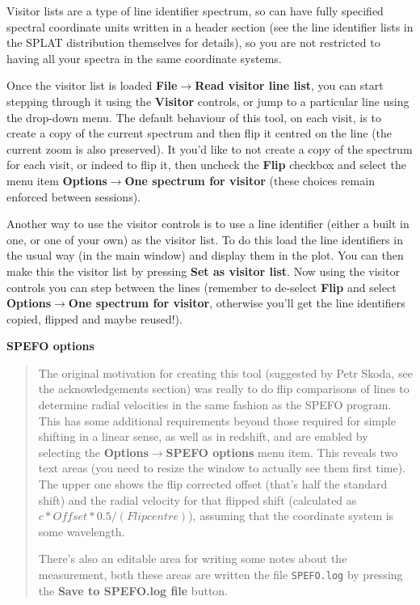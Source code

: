 \documentclass[twoside,11pt]{article}
\newcommand{\latexhtml}[2]{#1}
\renewcommand{\_}{\texttt{\symbol{95}}}
\newcommand{\submenuitem}[2]{\latexhtml{\textbf{#1$\rightarrow$#2}}{\textbf{#1->#2}}}
\newcommand{\labelitem}[1]{\textbf{#1}}
\newcommand{\hitext}[1]{\texttt{#1}}
\newcommand{\subheading}[1]{\textbf{\large{#1}}}
\begin{document}
Visitor lists are a type of line identifier spectrum, so can have fully
specified spectral coordinate units written in a header section (see the line
identifier lists in the SPLAT distribution themselves for details), so you are
not restricted to having all your spectra in the same coordinate systems.

Once the visitor list is loaded \submenuitem{File}{Read visitor line list},
you can start stepping through it using the \labelitem{Visitor} controls, or
jump to a particular line using the drop-down menu. The default behaviour of
this tool, on each visit, is to create a copy of the current spectrum and then
flip it centred on the line (the current zoom is also preserved). It you'd
like to not create a copy of the spectrum for each visit, or indeed to flip
it, then uncheck the \labelitem{Flip} checkbox and select the menu item
\submenuitem{Options}{One spectrum for visitor} (these choices remain enforced
between sessions).

Another way to use the visitor controls is to use a line identifier (either a
built in one, or one of your own) as the visitor list. To do this load the
line identifiers in the usual way (in the main window) and display them in the
plot. You can then make this the visitor list by pressing
\labelitem{Set as visitor list}. Now using the visitor controls you can step
between the lines (remember to de-select \labelitem{Flip} and select
\submenuitem{Options}{One spectrum for visitor}, otherwise you'll get the line
identifiers copied, flipped and maybe reused!).

\subheading{SPEFO options}
\begin{quote}
The original motivation for creating this tool (suggested by Petr Skoda, see
the acknowledgements section) was really to do flip comparisons of lines to
determine radial velocities in the same fashion as the SPEFO program. This has
some additional requirements beyond those required for simple shifting in a
linear sense, as well as in redshift, and are enabled by selecting the
\submenuitem{Options}{SPEFO options} menu item. This reveals two text areas
(you need to resize the window to actually see them first time). The upper one
shows the flip corrected offset (that's half the standard shift) and the
radial velocity for that flipped shift
(calculated as $c*Offset*0.5/(Flip centre)$), 
assuming that the coordinate system is some wavelength.

There's also an editable area for writing some notes about the measurement,
both these areas are written the file \hitext{SPEFO.log} by pressing the
\labelitem{Save to SPEFO.log file} button.

\end{quote}
\end{document}
